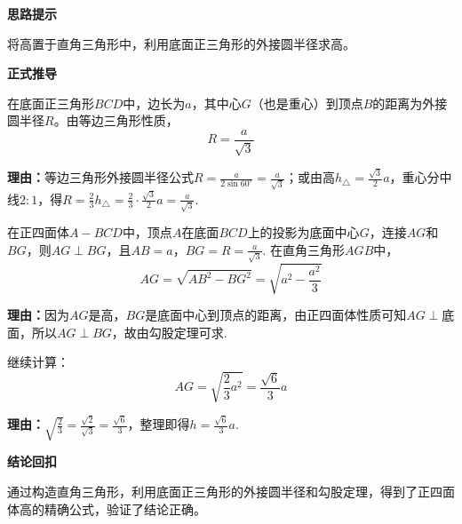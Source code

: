 \begin{proofbox}
	\textbf{\textcolor{CProof}{思路提示}}

	将高置于直角三角形中，利用底面正三角形的外接圆半径求高。

	\medskip
	\textbf{\textcolor{CProof}{正式推导}}
	\begin{description}[style=nextline, leftmargin=2.8em, labelsep=0.5em, itemsep=0.55em]
		\item[\textbf{步骤一（求底面中心距顶点）：}]在底面正三角形$BCD$中，边长为$a$，其中心$G$（也是重心）到顶点$B$的距离为外接圆半径$R$。由等边三角形性质，
			\[
				R = \frac{a}{\sqrt{3}}
			\]
			\par\textbf{理由：}等边三角形外接圆半径公式$R = \frac{a}{2\sin 60^\circ} = \frac{a}{\sqrt{3}}$；或由高$h_{\triangle}=\frac{\sqrt{3}}{2}a$，重心分中线$2:1$，得$R = \frac{2}{3}h_{\triangle} = \frac{2}{3}\cdot\frac{\sqrt{3}}{2}a = \frac{a}{\sqrt{3}}$.

		\item[\textbf{步骤二（构造直角三角形）：}]在正四面体$A-BCD$中，顶点$A$在底面$BCD$上的投影为底面中心$G$，连接$AG$和$BG$，则$AG\perp BG$，且$AB = a$，$BG = R = \frac{a}{\sqrt{3}}$. 在直角三角形$AGB$中，
			\[
				AG = \sqrt{AB^2 - BG^2} = \sqrt{a^2 - \frac{a^2}{3}}
			\]
			\par\textbf{理由：}因为$AG$是高，$BG$是底面中心到顶点的距离，由正四面体性质可知$AG\perp$底面，所以$AG\perp BG$，故由勾股定理可求.

		\item[\textbf{步骤三（化简得高公式）：}]继续计算：
			\[
				AG = \sqrt{\frac{2}{3}a^2} = \frac{\sqrt{6}}{3}a
			\]
			\par\textbf{理由：}$\sqrt{\frac{2}{3}} = \frac{\sqrt{2}}{\sqrt{3}} = \frac{\sqrt{6}}{3}$，整理即得$h = \frac{\sqrt{6}}{3}a$.
	\end{description}

	\medskip
	\textbf{\textcolor{CProof}{结论回扣}}

	通过构造直角三角形，利用底面正三角形的外接圆半径和勾股定理，得到了正四面体高的精确公式，验证了结论正确。
\end{proofbox}
